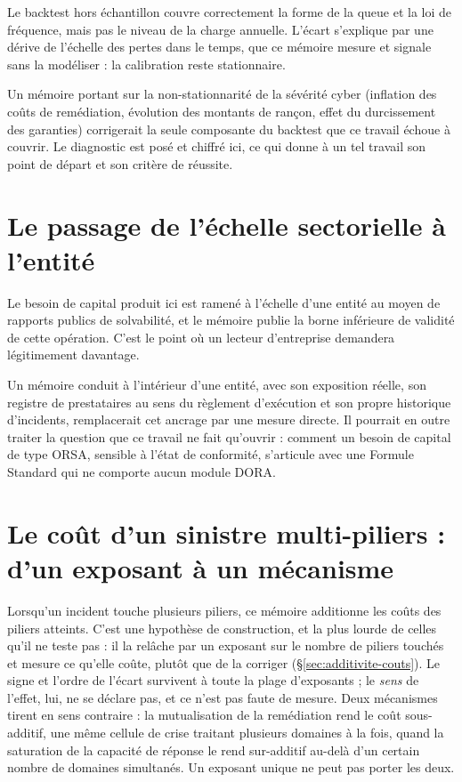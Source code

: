 Le backtest hors échantillon couvre correctement la forme de la queue et la loi de fréquence, mais
pas le niveau de la charge annuelle. L'écart s'explique par une dérive de l'échelle des pertes dans
le temps, que ce mémoire mesure et signale sans la modéliser : la calibration reste stationnaire.

Un mémoire portant sur la non-stationnarité de la sévérité cyber (inflation des coûts de
remédiation, évolution des montants de rançon, effet du durcissement des garanties) corrigerait
la seule composante du backtest que ce travail échoue à couvrir. Le diagnostic est posé et chiffré
ici, ce qui donne à un tel travail son point de départ et son critère de réussite.

\section{Le passage de l'échelle sectorielle à l'entité}

Le besoin de capital produit ici est ramené à l'échelle d'une entité au moyen de rapports publics
de solvabilité, et le mémoire publie la borne inférieure de validité de cette opération. C'est le
point où un lecteur d'entreprise demandera légitimement davantage.

Un mémoire conduit à l'intérieur d'une entité, avec son exposition réelle, son registre de
prestataires au sens du règlement d'exécution et son propre historique d'incidents, remplacerait
cet ancrage par une mesure directe. Il pourrait en outre traiter la question que ce travail ne fait
qu'ouvrir : comment un besoin de capital de type ORSA, sensible à l'état de conformité,
s'articule avec une Formule Standard qui ne comporte aucun module DORA.

\section{Le coût d'un sinistre multi-piliers : d'un exposant à un mécanisme}

Lorsqu'un incident touche plusieurs piliers, ce mémoire additionne les coûts des piliers atteints.
C'est une hypothèse de construction, et la plus lourde de celles qu'il ne teste pas : il la relâche
par un exposant sur le nombre de piliers touchés et mesure ce qu'elle coûte, plutôt que de la
corriger (\S\ref{sec:additivite-couts}). Le signe et l'ordre de l'écart survivent à toute la plage
d'exposants ; le \emph{sens} de l'effet, lui, ne se déclare pas, et ce n'est pas faute de mesure.
Deux mécanismes tirent en sens contraire : la mutualisation de la remédiation rend le coût
sous-additif, une même cellule de crise traitant plusieurs domaines à la fois, quand la saturation
de la capacité de réponse le rend sur-additif au-delà d'un certain nombre de domaines simultanés.
Un exposant unique ne peut pas porter les deux.

